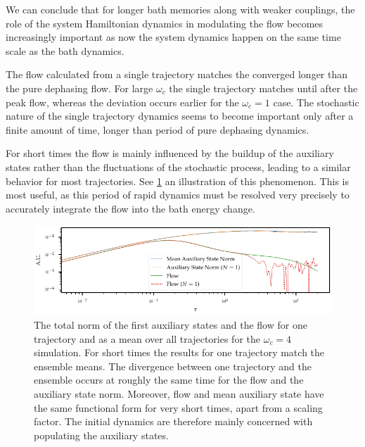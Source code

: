 We can conclude that for longer bath memories along with weaker
couplings, the role of the system Hamiltonian dynamics in modulating
the flow becomes increasingly important as now the system dynamics
happen on the same time scale as the bath dynamics.

The flow calculated from a single trajectory matches the converged
longer than the pure dephasing flow. For large \(ω_{c}\) the single
trajectory matches until after the peak flow, whereas the deviation
occurs earlier for the \(ω_{c}=1\) case. The stochastic nature of the
single trajectory dynamics seems to become important only after a
finite amount of time, longer than period of pure dephasing
dynamics.

For short times the flow is mainly influenced by the buildup of the
auxiliary states rather than the fluctuations of the stochastic
process, leading to a similar behavior for most trajectories. See
\cref{fig:flow_buildup} an illustration of this phenomenon. This is
most useful, as this period of rapid dynamics must be resolved very
precisely to accurately integrate the flow into the bath energy
change.
\begin{figure}[htp]
  \centering
  \includegraphics{figs/one_bath_syst/flow_buildup}
  \caption{\label{fig:flow_buildup} The total norm of the first
    auxiliary states and the flow for one trajectory and as a mean
    over all trajectories for the \(ω_{c}=4\) simulation. For short
    times the results for one trajectory match the ensemble means. The
    divergence between one trajectory and the ensemble occurs at
    roughly the same time for the flow and the auxiliary state
    norm. Moreover, flow and mean auxiliary state have the same
    functional form for very short times, apart from a scaling
    factor. The initial dynamics are therefore mainly concerned with
    populating the auxiliary states.}
\end{figure}

